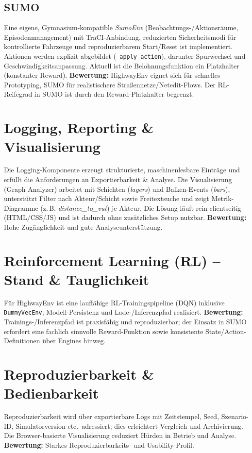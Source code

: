 \subsection*{SUMO}
Eine eigene, Gymnasium-kompatible \emph{SumoEnv} (Beobachtungs-/Aktionsräume, Episodenmanagement) mit TraCI-Anbindung, reduzierten Sicherheitsmodi für kontrollierte Fahrzeuge und reproduzierbarem Start/Reset ist implementiert.
Aktionen werden explizit abgebildet (\texttt{\_apply\_action}), darunter Spurwechsel und Geschwindigkeitsanpassung.
Aktuell ist die Belohnungsfunktion ein Platzhalter (konstanter Reward). \newline
\textbf{Bewertung:} HighwayEnv eignet sich für schnelles Prototyping, SUMO für realistischere Straßennetze/Netedit-Flows.
Der RL-Reifegrad in SUMO ist durch den Reward-Platzhalter begrenzt.

\section{Logging, Reporting \& Visualisierung}
Die Logging-Komponente erzeugt strukturierte, maschinenlesbare Einträge und erfüllt die Anforderungen an Exportierbarkeit \& Analyse.
Die Visualisierung (Graph Analyzer) arbeitet mit Schichten (\emph{layers}) und Balken-Events (\emph{bars}), unterstützt Filter nach Akteur/Schicht sowie Freitextsuche und zeigt Metrik-Diagramme (z.\,B. \textit{distance\_to\_vut}) je Akteur.
Die Lösung läuft rein clientseitig (HTML/CSS/JS) und ist dadurch ohne zusätzliches Setup nutzbar.\newline
\textbf{Bewertung:} Hohe Zugänglichkeit und gute Analyseunterstützung.

\section{Reinforcement Learning (RL) – Stand \& Tauglichkeit}
Für HighwayEnv ist eine lauffähige RL-Trainingspipeline (DQN) inklusive \texttt{DummyVecEnv}, Modell-Persistenz und Lade-/Inferenzpfad realisiert. \newline
\textbf{Bewertung:} Trainings-/Inferenzpfad ist praxisfähig und reproduzierbar; der Einsatz in SUMO erfordert eine fachlich sinnvolle Reward-Funktion sowie konsistente State/Action-Definitionen über Engines hinweg.

\section{Reproduzierbarkeit \& Bedienbarkeit}
Reproduzierbarkeit wird über exportierbare Logs mit Zeitstempel, Seed, Szenario-ID, Simulatorversion etc.\ adressiert; dies erleichtert Vergleich und Archivierung.
Die Browser-basierte Visualisierung reduziert Hürden in Betrieb und Analyse.\newline
\textbf{Bewertung:} Starkes Reproduzierbarkeits- und Usability-Profil.
